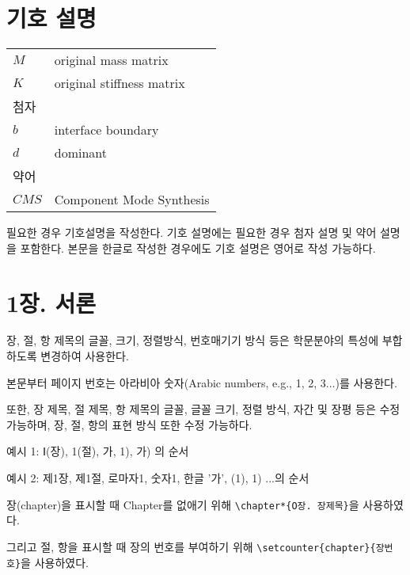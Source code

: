 \documentclass[11pt]{report}
\begin{document}
\newpage
{}
\chapter*{기호 설명}

\normalsize
\begin{tabular}{p{}p{}}
$M$	& original mass matrix\\
$K$	& original stiffness matrix\\[30pt]
\multicolumn{2}{l}{첨자}\\
$b$ & interface boundary\\
$d$ & dominant\\[30pt]
\multicolumn{2}{l}{약어}\\
$CMS$ & Component Mode Synthesis\\
\end{tabular}

\vspace{1cm}

필요한 경우 기호설명을 작성한다. 기호 설명에는 필요한 경우 첨자 설명 및 약어 설명을 포함한다. 본문을 한글로 작성한 경우에도 기호 설명은 영어로 작성 가능하다.

\newpage %

\chapter*{1장. 서론}
\setcounter{chapter}{1}

장, 절, 항 제목의 글꼴, 크기, 정렬방식, 번호매기기 방식 등은 학문분야의 특성에 부합하도록 변경하여 사용한다. \par
본문부터 페이지 번호는 아라비아 숫자(Arabic numbers, e.g., 1, 2, 3...)를 사용한다.\par
또한, 장 제목, 절 제목, 항 제목의 글꼴, 글꼴 크기, 정렬 방식, 자간 및 장평 등은 수정 가능하며, 장, 절, 항의 표현 방식 또한 수정 가능하다. \par
\bigskip
예시 1: Ⅰ(장), 1(절), 가, 1), 가) 의 순서 \par
예시 2: 제1장, 제1절, 로마자1, 숫자1, 한글 '가', (1), 1) ...의 순서 \par
\bigskip

장(chapter)을 표시할 때 Chapter를 없애기 위해 \verb|\chapter*{O장. 장제목}|을 사용하였다.\par
그리고 절, 항을 표시할 때 장의 번호를 부여하기 위해 \verb|\setcounter{chapter}{장번호}|을 사용하였다.\par
\end{document}
